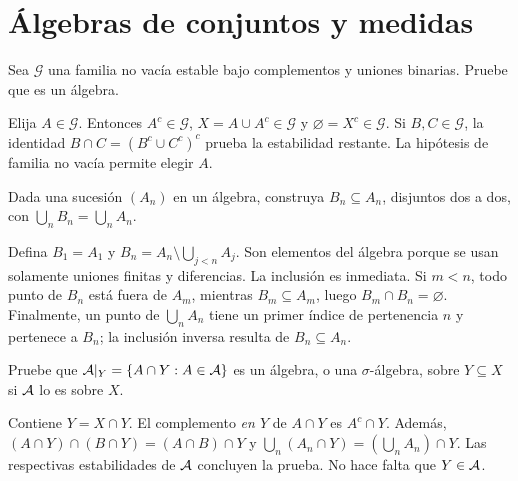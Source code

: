 
\chapter{Álgebras de conjuntos y medidas}

\begin{ejercicio}\label{ej:v2-l01-1}
Sea $\mathcal G$ una familia no vacía estable bajo complementos y uniones binarias. Pruebe que es un álgebra.
\end{ejercicio}
\begin{solucion}
Elija $A\in\mathcal G$. Entonces $A^c\in\mathcal G$, $X=A\cup A^c\in\mathcal G$ y $\varnothing=X^c\in\mathcal G$. Si $B,C\in\mathcal G$, la identidad $B\cap C=(B^c\cup C^c)^c$ prueba la estabilidad restante. La hipótesis de familia no vacía permite elegir $A$.
\end{solucion}

\begin{ejercicio}\label{ej:v2-l01-2}
Dada una sucesión $(A_n)$ en un álgebra, construya $B_n\subseteq A_n$, disjuntos dos a dos, con $\bigcup_nB_n=\bigcup_nA_n$.
\end{ejercicio}
\begin{solucion}
Defina $B_1=A_1$ y $B_n=A_n\setminus\bigcup_{j<n}A_j$. Son elementos del álgebra porque se usan solamente uniones finitas y diferencias. La inclusión es inmediata. Si $m<n$, todo punto de $B_n$ está fuera de $A_m$, mientras $B_m\subseteq A_m$, luego $B_m\cap B_n=\varnothing$. Finalmente, un punto de $\bigcup_nA_n$ tiene un primer índice de pertenencia $n$ y pertenece a $B_n$; la inclusión inversa resulta de $B_n\subseteq A_n$.
\end{solucion}

\begin{ejercicio}\label{ej:v2-l01-3}
Pruebe que $\mathcal A|_Y=\{A\cap Y:A\in\mathcal A\}$ es un álgebra, o una $\sigma$-álgebra, sobre $Y\subseteq X$ si $\mathcal A$ lo es sobre $X$.
\end{ejercicio}
\begin{solucion}
Contiene $Y=X\cap Y$. El complemento \emph{en $Y$} de $A\cap Y$ es $A^c\cap Y$. Además, $(A\cap Y)\cap(B\cap Y)=(A\cap B)\cap Y$ y $\bigcup_n(A_n\cap Y)=(\bigcup_nA_n)\cap Y$. Las respectivas estabilidades de $\mathcal A$ concluyen la prueba. No hace falta que $Y\in\mathcal A$.
\end{solucion}

